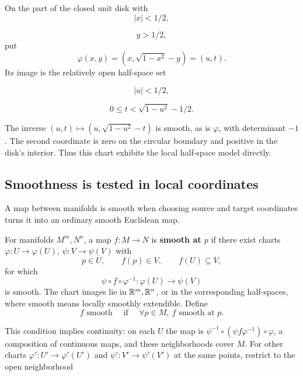 \begin{example}
On the part of the closed unit disk with
\[
|x|<1/2,
\]

\[
y>1/2,
\]
 put
\[
\varphi(x,y)=(x,\sqrt{1-x^2}-y)=(u,t).
\]
Its image is the relatively open half-space set

\[
|u|<1/2,
\]

\[
0\leq t<\sqrt{1-u^2}-1/2.
\]

The inverse $(u,t)\mapsto(u,\sqrt{1-u^2}-t)$ is smooth, as is
$\varphi$, with determinant $-1$. The second coordinate is zero on
the circular boundary and positive in the disk's interior. Thus this
chart exhibits the local half-space model directly.
\end{example}

\subsection{Smoothness is tested in local coordinates}
A map between manifolds is smooth when choosing source and target
coordinates turns it into an ordinary smooth Euclidean map. 
\begin{center}
\end{center}
\begin{definition}\label{def:smooth-manifold-map}
For manifolds $M^m,N^n$, a map $f:M\to N$ is \textbf{smooth at $p$}
if there exist charts $\varphi:U\to\varphi(U)$, $\psi:V\to\psi(V)$ with
\[
p\in U,\qquad f(p)\in V,\qquad f(U)\subseteq V,
\]
for which
\[
\boxed{\psi\circ f\circ\varphi^{-1}:\varphi(U)\longrightarrow\psi(V)}
\]
is smooth. The chart images lie in $\mathbb{R}^m,\mathbb{R}^n$, or in the corresponding
half-spaces, where smooth means locally smoothly extendible. Define
\[
f\text{ smooth}\quad\text{ if }\quad
\forall p\in M,\ f\text{ smooth at }p.
\]
\end{definition}
This condition implies continuity: on each $U$ the map is
$\psi^{-1}\circ(\psi f\varphi^{-1})\circ\varphi$, a composition of
continuous maps, and these neighborhoods cover $M$. For other charts
$\varphi':U'\to\varphi'(U')$ and $\psi':V'\to\psi'(V')$ at the
same points, restrict to the open neighborhood
